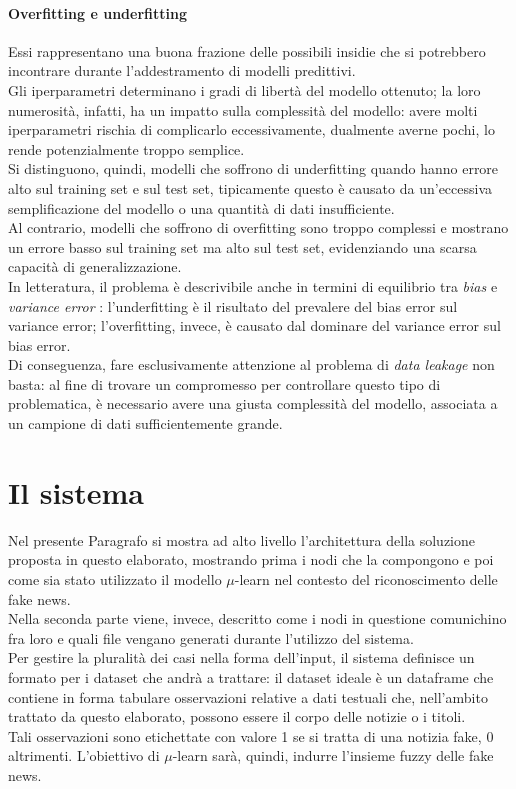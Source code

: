 \documentclass[12pt]{report}
\theoremstyle{definition}
\begin{document}
\paragraph{Overfitting e underfitting}
Essi rappresentano una buona frazione delle possibili insidie che si potrebbero incontrare durante l'addestramento di modelli predittivi.
\\
Gli iperparametri determinano i gradi di libertà del modello ottenuto; la loro numerosità, infatti, ha un impatto sulla complessità del modello: avere molti iperparametri rischia di complicarlo eccessivamente, dualmente averne pochi, lo rende potenzialmente troppo semplice. 
\\
Si distinguono, quindi, modelli che soffrono di underfitting quando hanno errore alto sul training set e sul test set, tipicamente questo è causato da un'eccessiva semplificazione del modello o una quantità di dati insufficiente.
\\
Al contrario, modelli che soffrono di overfitting sono troppo complessi e mostrano un errore basso sul training set ma alto sul test set, evidenziando una scarsa capacità di generalizzazione.
\\
In letteratura, il problema è descrivibile anche in termini di equilibrio tra \textit{bias} e \textit{variance error} \cite{31}: l'underfitting è il risultato del prevalere del bias error sul variance error; l'overfitting, invece, è causato dal dominare del variance error sul bias error.
\\
Di conseguenza, fare esclusivamente attenzione al problema di \textit{data leakage} non basta:
al fine di trovare un compromesso per controllare questo tipo di problematica, è necessario avere una giusta complessità del modello, associata a un campione di dati sufficientemente grande.

\section{Il sistema}
\label{sistema}
Nel presente Paragrafo si mostra ad alto livello l'architettura della soluzione proposta in questo elaborato, mostrando prima i nodi che la compongono e poi come sia stato utilizzato il modello $\mu$-learn nel contesto del riconoscimento delle fake news.
\\
Nella seconda parte viene, invece, descritto come i nodi in questione comunichino fra loro e quali file vengano generati durante l'utilizzo del sistema.
\\
Per gestire la pluralità dei casi nella forma dell'input, il sistema definisce un formato per i dataset che andrà a trattare: il dataset ideale è un dataframe che contiene in forma tabulare osservazioni relative a dati testuali che, nell'ambito trattato da questo elaborato, possono essere il corpo delle notizie o i titoli.
\\
Tali osservazioni sono etichettate con valore 1 se si tratta di una notizia fake, 0 altrimenti. L'obiettivo di $\mu$-learn sarà, quindi, indurre l'insieme fuzzy delle fake news.
\end{document}
